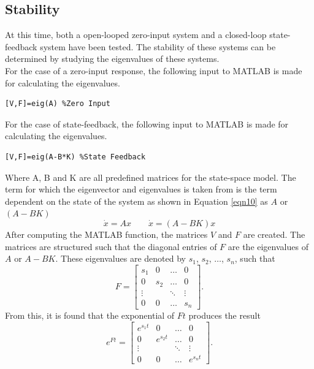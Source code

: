 \documentclass[12pt]{article}
\begin{document}
\subsection{Stability}
At this time, both a open-looped zero-input system and a closed-loop state-feedback system have been tested. The stability of these systems can be determined by studying the eigenvalues of these systems. 
\\
For the case of a zero-input response, the following input to MATLAB is made for calculating the eigenvalues.
\begin{lstlisting}[frame=single]
[V,F]=eig(A) %Zero Input
\end{lstlisting}
For the case of state-feedback, the following input to MATLAB is made for calculating the eigenvalues.
\begin{lstlisting}[frame=single]
[V,F]=eig(A-B*K) %State Feedback
\end{lstlisting}
Where A, B and K are all predefined matrices for the state-space model. The term for which the eigenvector and eigenvalues is taken from is the term dependent on the state of the system as shown in Equation \ref{eqn10} as $A$ or $(A-BK)$
\begin{equation}
\label{eqn10}
\dot{x} = Ax
\qquad
\dot{x} = (A-BK)x
\end{equation}
After computing the MATLAB function, the matrices $V$ and $F$ are created. The matrices are structured such that the diagonal entries of $F$ are the eigenvalues of $A$ or $A-BK$.  These eigenvalues are denoted by $s_1$, $s_2$, $\hdots$, $s_n$, such that
\\
\begin{equation*}
F = 
\begin{bmatrix}
s_1 & 0 & \hdots & 0 \\
0 & s_2 & \hdots & 0 \\
\vdots & & \ddots & \vdots \\
0 & 0 & \hdots & s_n
\end{bmatrix}.
\end{equation*}
From this, it is found that the exponential of $F t$ produces the result
\begin{equation*}
e^{Ft}  =
\begin{bmatrix}
e^{s_1 t} & 0 & \hdots & 0 \\
0 & e^{s_2 t} & \hdots & 0 \\
\vdots & & \ddots & \vdots \\
0 & 0 & \hdots & e^{s_n t}
\end{bmatrix}.
\end{equation*}
\end{document}
